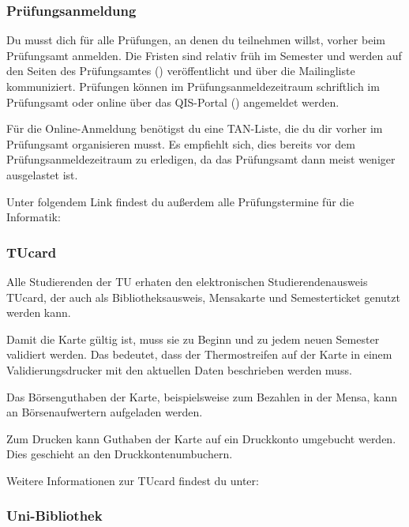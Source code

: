 \begin{multicols}{2}
\subsubsection{Prüfungsanmeldung}
	\label{todoanmeldung}

	Du musst dich für alle Prüfungen, an denen du teilnehmen willst, vorher beim Prüfungsamt anmelden.
Die Fristen sind relativ früh im Semester und werden auf den Seiten des Prüfungsamtes () veröffentlicht und über die Mailingliste kommuniziert.
Prüfungen können im Prüfungsanmeldezeitraum schriftlich im Prüfungsamt oder online über das QIS-Portal () angemeldet werden.

	Für die Online-Anmeldung benötigst du eine TAN-Liste, die du dir vorher im Prüfungsamt organisieren musst. Es empfiehlt sich, dies bereits vor dem Prüfungsanmeldezeitraum zu erledigen, da das Prüfungsamt dann meist weniger ausgelastet ist.

	Unter folgendem Link findest du außerdem alle Prüfungstermine für die Informatik:

\subsubsection{TUcard}
	\label{tucard}
	
	Alle Studierenden der TU erhaten den elektronischen Studierendenausweis TUcard, der auch als Bibliotheksausweis, Mensakarte und Semesterticket genutzt werden kann.

	Damit die Karte gültig ist, muss sie zu Beginn und zu jedem neuen Semester validiert werden. Das bedeutet, dass der Thermostreifen auf der Karte in einem Validierungsdrucker mit den aktuellen Daten beschrieben werden muss.

	Das Börsenguthaben der Karte, beispielsweise zum Bezahlen in der Mensa, kann an Börsenaufwertern aufgeladen werden.

	Zum Drucken kann Guthaben der Karte auf ein Druckkonto umgebucht werden. Dies geschieht an den Druckkontenumbuchern.

	Weitere Informationen zur TUcard findest du unter: 

\subsubsection{Uni-Bibliothek}
	\label{todobib}


\end{multicols}
